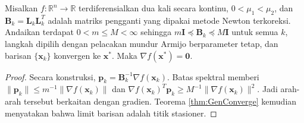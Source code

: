 \begin{cgalgorithm}[htbp]
\noindent{}
\end{cgalgorithm}
\begin{cgalgorithm}[htbp]
\noindent{}
\caption{Metode Newton dengan panjang langkah variabel dan dekomposisi Cholesky termodifikasi}
\label{alg:CorrectedNewtonsMethod}
\end{cgalgorithm}

\begin{theorem} Misalkan $f:\mathbb{R}^n\rightarrow\mathbb{R}$ terdiferensialkan dua kali secara kontinu, $0<\mu_1<\mu_2$, dan $\mathbf{B}_k=\mathbf{L}_k\mathbf{L}_k^T$ adalah matriks pengganti yang dipakai metode Newton terkoreksi. Andaikan terdapat $0<m\leq M<\infty$ sehingga $m\mathbf{I}\preceq\mathbf{B}_k\preceq M\mathbf{I}$ untuk semua $k$, langkah dipilih dengan pelacakan mundur Armijo berparameter tetap, dan barisan $\{\mathbf{x}_k\}$ konvergen ke $\mathbf{x}^*$. Maka $\nabla f(\mathbf{x}^*)=\mathbf{0}$.
\end{theorem}
\begin{proof} Secara konstruksi, $\mathbf{p}_k=\mathbf{B}_k^{-1}\nabla f(\mathbf{x}_k)$. Batas spektral memberi $\lVert\mathbf{p}_k\rVert\leq m^{-1}\lVert\nabla f(\mathbf{x}_k)\rVert$ dan $\nabla f(\mathbf{x}_k)^T\mathbf{p}_k\geq M^{-1}\lVert\nabla f(\mathbf{x}_k)\rVert^2$. Jadi arah-arah tersebut berkaitan dengan gradien. Teorema \ref{thm:GenConverge} kemudian menyatakan bahwa limit barisan adalah titik stasioner.
\end{proof}

